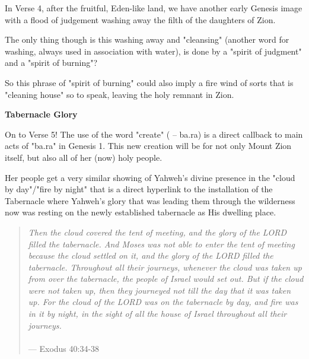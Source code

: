 \documentclass[11pt]{article}
\begin{document}
In Verse 4, after the fruitful, Eden-like land, we have another early Genesis image with a flood of judgement washing away the filth of the daughters of Zion.

{\vspace{1em}}

The only thing though is this washing away and "cleansing" (another word for washing, always used in association with water), is done by a "spirit of judgment" and a "spirit of burning"?

{\vspace{1em}}


So this phrase of "spirit of burning" could also imply a fire wind of sorts that is "cleaning house" so to speak, leaving the holy remnant in Zion.


\vspace{3em}
{\large\bfseries Tabernacle Glory}
\vspace{1em}



On to Verse 5! The use of the word "create" ( – ba.ra) is a direct callback to main acts of "ba.ra" in Genesis 1.
This new creation will be for not only Mount Zion itself, but also all of her (now) holy people.

{\vspace{1em}}

Her people get a very similar showing of Yahweh's divine presence in the "cloud by day"/"fire by night" that is a direct hyperlink to the installation of the Tabernacle where
Yahweh's glory that was leading them through the wilderness now was resting on the newly established tabernacle as His dwelling place.

\begin{quote}
\textit{
Then the cloud covered the tent of meeting, and the glory of the LORD filled the tabernacle.
And Moses was not able to enter the tent of meeting because the cloud settled on it, and the glory of the LORD filled the tabernacle. 
Throughout all their journeys, whenever the cloud was taken up from over the tabernacle, the people of Israel would set out. 
But if the cloud were not taken up, then they journeyed not till the day that it was taken up.
For the cloud of the LORD was on the tabernacle by day, and fire was in it by night, in the sight of all the house of Israel throughout all their journeys.
}
\\\\
\hfill --- Exodus 40:34-38
\end{quote}
\end{document}
